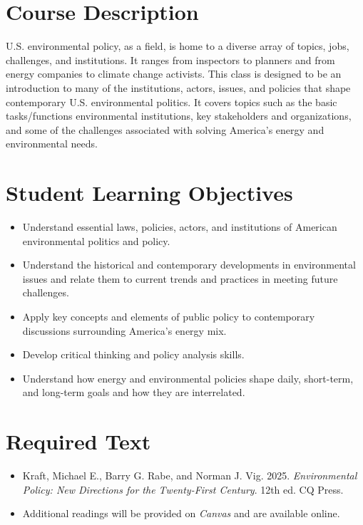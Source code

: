 \documentclass[12pt, letterpaper]{article}
\begin{document}
\section*{Course Description}

U.S. environmental policy, as a field, is home to a diverse array of topics, jobs, challenges, and institutions. It ranges from inspectors to planners and from energy companies to climate change activists. This class is designed to be an introduction to many of the institutions, actors, issues, and policies that shape contemporary U.S. environmental politics. It covers topics such as the basic tasks/functions environmental institutions, key stakeholders and organizations, and some of the challenges associated with solving America’s energy and environmental needs. 

\section*{Student Learning Objectives}

\begin{itemize}
    \item Understand essential laws, policies, actors, and institutions of American environmental politics and policy.
    \item Understand the historical and contemporary developments in environmental issues and relate them to current trends and practices in meeting future challenges.
    \item Apply key concepts and elements of public policy to contemporary discussions surrounding America’s energy mix.
    \item Develop critical thinking and policy analysis skills.
    \item Understand how energy and environmental policies shape daily, short-term, and long-term goals and how they are interrelated.
\end{itemize}

\section*{Required Text}

\begin{itemize}
    \item Kraft, Michael E., Barry G. Rabe, and Norman J. Vig. 2025. \emph{Environmental Policy: New Directions for the Twenty-First Century}. 12th ed. CQ Press.
    \item Additional readings will be provided on \emph{Canvas} and are available online.
\end{itemize}
\end{document}
